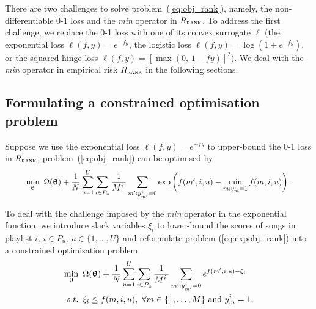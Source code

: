 There are two challenges to %
solve problem~(\ref{eq:obj_rank}),
namely, the non-differentiable 0-1 loss and the \emph{min} operator in $R_\textsc{rank}$.
To address the first challenge, we replace the 0-1 loss with one of its convex surrogate $\ell$
(\eg the exponential loss $\ell(f, y) = e^{-fy}$, the logistic loss $\ell(f, y) = \log(1 + e^{-fy})$,
or the squared hinge loss $\ell(f, y) = [\max(0, \, 1 - fy)]^2$).
We deal with the \emph{min} operator in empirical risk $R_\textsc{rank}$ in the following sections.




\subsection{Formulating a constrained optimisation problem}

Suppose we use the exponential loss $\ell(f, y) = e^{-fy}$ to upper-bound the 0-1 loss in $R_\textsc{rank}$,
problem~(\ref{eq:obj_rank}) can be optimised by
\begin{equation}
\label{eq:expobj_rank}
\resizebox{.9\linewidth}{!}{$\displaystyle
\min_{\upthetabm} \ \Omega(\upthetabm) + \frac{1}{N} \sum_{u=1}^U \sum_{i \in P_u} \frac{1}{M_-^i} 
                  \sum_{m': y_{m'}^i = 0} \exp \left(f(m', i, u) - \min_{m: y_m^i = 1} f(m, i, u) \right).
$}
\end{equation}

To deal with the challenge imposed by the \emph{min} operator in the exponential function, 
we introduce slack variables $\xi_i$ to lower-bound the scores of songs in playlist $i, \, i \in P_u, \, u \in \{1,\dots,U\}$ 
and 
reformulate problem (\ref{eq:expobj_rank}) into a constrained optimisation problem %
\begin{equation}
\label{eq:expobj_cons}
\begin{aligned}
\min_{\upthetabm} \ \, & \Omega(\upthetabm) + \frac{1}{N} \sum_{u=1}^U \sum_{i \in P_u} \frac{1}{M_-^i} \sum_{m': y_{m'}^i = 0} e^{f(m', i, u) - \xi_i} \\
s.t. \ \, & \xi_i \le f(m, i, u), \ \forall m \in \{1,\dots,M\} \ \text{and} \ y_m^i = 1.
\end{aligned}
\end{equation}

